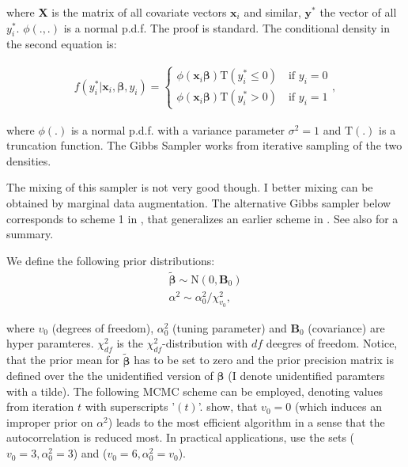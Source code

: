 \documentclass[11pt,a4paper]{article}
\newcommand{\f}{\mathit{f}}
\begin{document}
where $\mathbf{X}$ is the matrix of all covariate vectors $\mathbf{x}_i$ and similar, $\mathbf{y}^{*}$ the vector of all $y_i^{*}$. $\phi(.,.)$ is a normal p.d.f. The proof is standard. The conditional density in the second equation is: 

\begin{equation}
\begin{split}
	  \f(y_{i}^{*} | \mathbf{x}_i, \boldsymbol{\beta}, y_i)  = \left \{
	  \begin{array}{ll}
	    	\phi(\mathbf{x}_i \boldsymbol{\beta})\mathrm{T}(y_i^* \leq 0) \quad \text{if \ } y_i = 0 \\
	    	\phi(\mathbf{x}_i \boldsymbol{\beta})\mathrm{T}(y_i^* > 0) \quad \text{if \ } y_i = 1
	  \end{array} \right.,
\end{split}	
\end{equation}

where $\phi(.)$ is a normal p.d.f. with a variance parameter $\sigma^2=1$ and $\mathrm{T}(.)$ is a truncation function. The Gibbs Sampler works from iterative sampling of the two densities. 

The mixing of this sampler is not very good though. I better mixing can be obtained by marginal data augmentation.
The alternative Gibbs sampler below corresponds to scheme 1 in \citet[p. 317-318]{Imai.vanDyk.2005}, that generalizes an earlier scheme in \citet{vanDyk.Meng.2001}. See also \citet[390]{Jackman.2009} for a summary. 

We define the following prior distributions: 
\begin{equation}
	\begin{split}
	\bm{\tilde{\beta}} \sim \mathrm{N}(0,\mathbf{B}_0) \\
	\alpha^2 \sim \alpha_0^2/\chi_{v_0}^2, 
	\end{split}
\end{equation}

where $v_0$ (degrees of freedom), $\alpha_0^2$ (tuning parameter) and $\mathbf{B}_0$ (covariance) are hyper paramteres. $\chi_{df}^2$ is the $\chi_{df}^2$-distribution with $df$ deegres of freedom. Notice, that the prior mean for $\bm{\tilde{\beta}}$ has to be set to zero and the prior precision matrix is defined over the the unidentified version of $\bm{\beta}$ (I denote unidentified paramters with a tilde).  The following MCMC scheme can be employed, denoting values from iteration $t$ with superscripts '$(t)$'. \citet{vanDyk.Meng.2001} show, that $v_0=0$ (which induces an improper prior on $\alpha^2$) leads to the most efficient algorithm in a sense that the autocorrelation is reduced most. In practical applications, \citet{Imai.vanDyk.2005} use the sets ($v_0=3,\alpha_0^2=3$) and ($v_0=6,\alpha_0^2=v_0$). 
\end{document}
